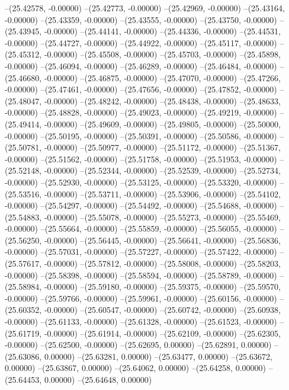 --(25.42578, -0.00000)
--(25.42773, -0.00000)
--(25.42969, -0.00000)
--(25.43164, -0.00000)
--(25.43359, -0.00000)
--(25.43555, -0.00000)
--(25.43750, -0.00000)
--(25.43945, -0.00000)
--(25.44141, -0.00000)
--(25.44336, -0.00000)
--(25.44531, -0.00000)
--(25.44727, -0.00000)
--(25.44922, -0.00000)
--(25.45117, -0.00000)
--(25.45312, -0.00000)
--(25.45508, -0.00000)
--(25.45703, -0.00000)
--(25.45898, -0.00000)
--(25.46094, -0.00000)
--(25.46289, -0.00000)
--(25.46484, -0.00000)
--(25.46680, -0.00000)
--(25.46875, -0.00000)
--(25.47070, -0.00000)
--(25.47266, -0.00000)
--(25.47461, -0.00000)
--(25.47656, -0.00000)
--(25.47852, -0.00000)
--(25.48047, -0.00000)
--(25.48242, -0.00000)
--(25.48438, -0.00000)
--(25.48633, -0.00000)
--(25.48828, -0.00000)
--(25.49023, -0.00000)
--(25.49219, -0.00000)
--(25.49414, -0.00000)
--(25.49609, -0.00000)
--(25.49805, -0.00000)
--(25.50000, -0.00000)
--(25.50195, -0.00000)
--(25.50391, -0.00000)
--(25.50586, -0.00000)
--(25.50781, -0.00000)
--(25.50977, -0.00000)
--(25.51172, -0.00000)
--(25.51367, -0.00000)
--(25.51562, -0.00000)
--(25.51758, -0.00000)
--(25.51953, -0.00000)
--(25.52148, -0.00000)
--(25.52344, -0.00000)
--(25.52539, -0.00000)
--(25.52734, -0.00000)
--(25.52930, -0.00000)
--(25.53125, -0.00000)
--(25.53320, -0.00000)
--(25.53516, -0.00000)
--(25.53711, -0.00000)
--(25.53906, -0.00000)
--(25.54102, -0.00000)
--(25.54297, -0.00000)
--(25.54492, -0.00000)
--(25.54688, -0.00000)
--(25.54883, -0.00000)
--(25.55078, -0.00000)
--(25.55273, -0.00000)
--(25.55469, -0.00000)
--(25.55664, -0.00000)
--(25.55859, -0.00000)
--(25.56055, -0.00000)
--(25.56250, -0.00000)
--(25.56445, -0.00000)
--(25.56641, -0.00000)
--(25.56836, -0.00000)
--(25.57031, -0.00000)
--(25.57227, -0.00000)
--(25.57422, -0.00000)
--(25.57617, -0.00000)
--(25.57812, -0.00000)
--(25.58008, -0.00000)
--(25.58203, -0.00000)
--(25.58398, -0.00000)
--(25.58594, -0.00000)
--(25.58789, -0.00000)
--(25.58984, -0.00000)
--(25.59180, -0.00000)
--(25.59375, -0.00000)
--(25.59570, -0.00000)
--(25.59766, -0.00000)
--(25.59961, -0.00000)
--(25.60156, -0.00000)
--(25.60352, -0.00000)
--(25.60547, -0.00000)
--(25.60742, -0.00000)
--(25.60938, -0.00000)
--(25.61133, -0.00000)
--(25.61328, -0.00000)
--(25.61523, -0.00000)
--(25.61719, -0.00000)
--(25.61914, -0.00000)
--(25.62109, -0.00000)
--(25.62305, -0.00000)
--(25.62500, -0.00000)
--(25.62695, 0.00000)
--(25.62891, 0.00000)
--(25.63086, 0.00000)
--(25.63281, 0.00000)
--(25.63477, 0.00000)
--(25.63672, 0.00000)
--(25.63867, 0.00000)
--(25.64062, 0.00000)
--(25.64258, 0.00000)
--(25.64453, 0.00000)
--(25.64648, 0.00000)
